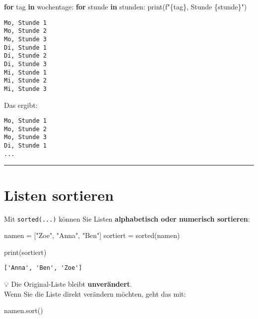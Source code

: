 \documentclass[
  letterpaper,
  DIV=11,
  numbers=noendperiod]{scrreprt}
\newenvironment{Shaded}{\begin{snugshade}}{\end{snugshade}}
\newcommand{\BuiltInTok}[1]{\textcolor[rgb]{0.00,0.23,0.31}{#1}}
\newcommand{\ControlFlowTok}[1]{\textcolor[rgb]{0.00,0.23,0.31}{\textbf{#1}}}
\newcommand{\KeywordTok}[1]{\textcolor[rgb]{0.00,0.23,0.31}{\textbf{#1}}}
\newcommand{\NormalTok}[1]{\textcolor[rgb]{0.00,0.23,0.31}{#1}}
\newcommand{\OperatorTok}[1]{\textcolor[rgb]{0.37,0.37,0.37}{#1}}
\newcommand{\SpecialCharTok}[1]{\textcolor[rgb]{0.37,0.37,0.37}{#1}}
\newcommand{\SpecialStringTok}[1]{\textcolor[rgb]{0.13,0.47,0.30}{#1}}
\newcommand{\StringTok}[1]{\textcolor[rgb]{0.13,0.47,0.30}{#1}}
\begin{document}
\begin{tcolorbox}
\begin{Shaded}
\begin{Highlighting}[]
\ControlFlowTok{for}\NormalTok{ tag }\KeywordTok{in}\NormalTok{ wochentage:}
    \ControlFlowTok{for}\NormalTok{ stunde }\KeywordTok{in}\NormalTok{ stunden:}
        \BuiltInTok{print}\NormalTok{(}\SpecialStringTok{f"}\SpecialCharTok{\{}\NormalTok{tag}\SpecialCharTok{\}}\SpecialStringTok{, Stunde }\SpecialCharTok{\{}\NormalTok{stunde}\SpecialCharTok{\}}\SpecialStringTok{"}\NormalTok{)}
\end{Highlighting}
\end{Shaded}

\begin{verbatim}
Mo, Stunde 1
Mo, Stunde 2
Mo, Stunde 3
Di, Stunde 1
Di, Stunde 2
Di, Stunde 3
Mi, Stunde 1
Mi, Stunde 2
Mi, Stunde 3
\end{verbatim}

Das ergibt:

\begin{verbatim}
Mo, Stunde 1
Mo, Stunde 2
Mo, Stunde 3
Di, Stunde 1
...
\end{verbatim}

\begin{center}\rule{0.5\linewidth}{0.5pt}\end{center}

\section{Listen sortieren}\label{listen-sortieren}

Mit \texttt{sorted(...)} können Sie Listen \textbf{alphabetisch oder
numerisch sortieren}:

\begin{Shaded}
\begin{Highlighting}[]
\NormalTok{namen }\OperatorTok{=}\NormalTok{ [}\StringTok{"Zoe"}\NormalTok{, }\StringTok{"Anna"}\NormalTok{, }\StringTok{"Ben"}\NormalTok{]}
\NormalTok{sortiert }\OperatorTok{=} \BuiltInTok{sorted}\NormalTok{(namen)}

\BuiltInTok{print}\NormalTok{(sortiert)}
\end{Highlighting}
\end{Shaded}

\begin{verbatim}
['Anna', 'Ben', 'Zoe']
\end{verbatim}

💡 Die Original-Liste bleibt \textbf{unverändert}.\\
Wenn Sie die Liste direkt verändern möchten, geht das mit:

\begin{Shaded}
\begin{Highlighting}[]
\NormalTok{namen.sort()}
\end{Highlighting}
\end{Shaded}


\end{tcolorbox}
\end{document}
